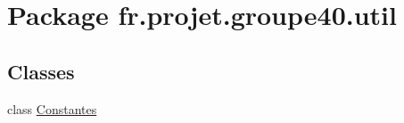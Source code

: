 \hypertarget{namespacefr_1_1projet_1_1groupe40_1_1util}{}\section{Package fr.\+projet.\+groupe40.\+util}
\label{namespacefr_1_1projet_1_1groupe40_1_1util}
\subsection*{Classes}
\begin{DoxyCompactItemize}
\item 
class \hyperlink{classfr_1_1projet_1_1groupe40_1_1util_1_1_constantes}{Constantes}
\end{DoxyCompactItemize}
